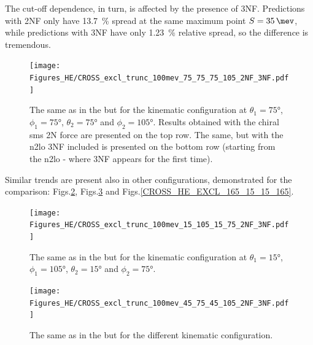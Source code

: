     The cut-off dependence, in turn, is affected by the presence of 3NF. Predictions with 2NF only have
    \SI{13.7}{\percent} spread at the same maximum point $S=\SI{35}{\mev}$, while predictions with 3NF
    have only \SI{1.23}{\percent} relative spread, so the difference is tremendous.

        \begin{figure}[h]
            \begin{center}
                \texttt{[image: Figures\_HE/CROSS\_excl\_trunc\_100mev\_75\_75\_75\_105\_2NF\_3NF.pdf]}
                \end{center}
                \caption{The same as in the  but for the kinematic
                configuration at
                $\theta_1 = \ang{75}$, $\phi_1 = \ang{75}$,
                $\theta_2 = \ang{75}$ and $\phi_2 = \ang{105}$.
                Results obtained with the chiral \gls{sms} 2N force 
                are presented on the top row. The same, but
                with the \gls{n2lo} 3NF included is presented on the bottom row
                (starting from the \gls{n2lo} - where 3NF appears for the first time).}
                \label{CROSS_HE_EXCL_75_75_75_105}
        \end{figure}


    Similar trends are present also in other configurations, demonstrated for the comparison:
    Figs.\ref{CROSS_HE_EXCL_15_105_15_75},
    Figs.\ref{CROSS_HE_EXCL_45_75_45_105} and
    Figs.\ref{CROSS_HE_EXCL_165_15_15_165}.

    
        \begin{figure}[h]
            \begin{center}
                \texttt{[image: Figures\_HE/CROSS\_excl\_trunc\_100mev\_15\_105\_15\_75\_2NF\_3NF.pdf]}
                \end{center}
                \caption{The same as in the  but for the kinematic
                configuration at
                $\theta_1 = \ang{15}$, $\phi_1 = \ang{105}$,
                $\theta_2 = \ang{15}$ and $\phi_2 = \ang{75}$.}
                \label{CROSS_HE_EXCL_15_105_15_75}
        \end{figure}




        \begin{figure}[h]
            \begin{center}
                \texttt{[image: Figures\_HE/CROSS\_excl\_trunc\_100mev\_45\_75\_45\_105\_2NF\_3NF.pdf]}
                \end{center}
                \caption{The same as in the  but for the different kinematic
                configuration.}
                \label{CROSS_HE_EXCL_45_75_45_105}
        \end{figure}


